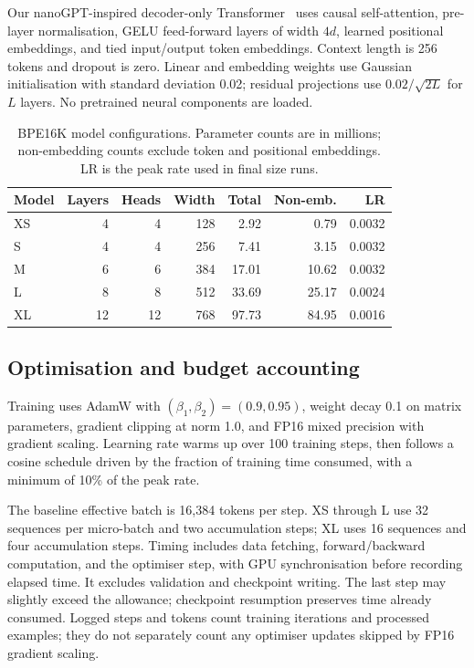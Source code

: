 \documentclass[11pt]{article}
\begin{document}
Our nanoGPT-inspired decoder-only Transformer~\cite{nanogpt} uses causal self-attention, pre-layer normalisation, GELU feed-forward layers of width $4d$, learned positional embeddings, and tied input/output token embeddings. Context length is 256 tokens and dropout is zero. Linear and embedding weights use Gaussian initialisation with standard deviation 0.02; residual projections use $0.02/\sqrt{2L}$ for $L$ layers. No pretrained neural components are loaded.

\begin{table}[htbp]
\centering\small
\caption{BPE16K model configurations. Parameter counts are in millions; non-embedding counts exclude token and positional embeddings. LR is the peak rate used in final size runs.}
\label{tab:models}
\begin{tabular}{lrrrrrr}
\toprule
Model & Layers & Heads & Width & Total & Non-emb. & LR\\
\midrule
XS & 4 & 4 & 128 & 2.92 & 0.79 & 0.0032\\
S & 4 & 4 & 256 & 7.41 & 3.15 & 0.0032\\
M & 6 & 6 & 384 & 17.01 & 10.62 & 0.0032\\
L & 8 & 8 & 512 & 33.69 & 25.17 & 0.0024\\
XL & 12 & 12 & 768 & 97.73 & 84.95 & 0.0016\\
\bottomrule
\end{tabular}
\end{table}

\subsection{Optimisation and budget accounting}
Training uses AdamW with $(\beta_1,\beta_2)=(0.9,0.95)$, weight decay 0.1 on matrix parameters, gradient clipping at norm 1.0, and FP16 mixed precision with gradient scaling. Learning rate warms up over 100 training steps, then follows a cosine schedule driven by the fraction of training time consumed, with a minimum of 10\% of the peak rate.

The baseline effective batch is 16,384 tokens per step. XS through L use 32 sequences per micro-batch and two accumulation steps; XL uses 16 sequences and four accumulation steps. Timing includes data fetching, forward/backward computation, and the optimiser step, with GPU synchronisation before recording elapsed time. It excludes validation and checkpoint writing. The last step may slightly exceed the allowance; checkpoint resumption preserves time already consumed. Logged steps and tokens count training iterations and processed examples; they do not separately count any optimiser updates skipped by FP16 gradient scaling.
\end{document}
